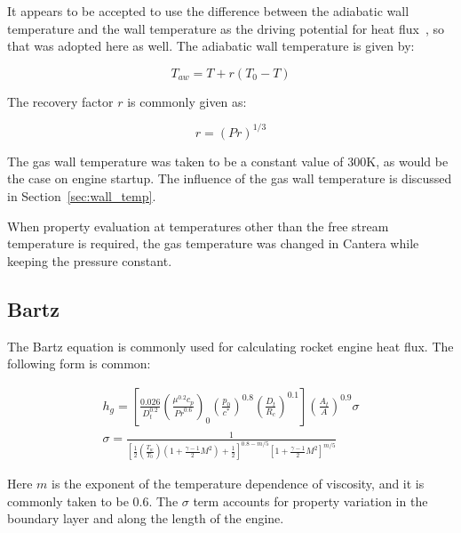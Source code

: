 \documentclass[11pt]{article}
\begin{document}
It appears to be accepted to use the difference between the adiabatic wall temperature and the wall temperature as the driving potential for heat flux~\cite{huang_modern_1992, bartz_turbulent_1965, grisson_liquid_1991}, so that was adopted here as well. The adiabatic wall temperature is given by:

\begin{equation}
    T_{aw} = T + r(T_0 - T)
\end{equation}

The recovery factor $r$ is commonly given as:

\begin{equation}
    r = (Pr)^{1/3}
\end{equation}

The gas wall temperature was taken to be a constant value of 300K, as would be the case on engine startup. The influence of the gas wall temperature is discussed in Section~\ref{sec:wall_temp}.

When property evaluation at temperatures other than the free stream temperature is required, the gas temperature was changed in Cantera while keeping the pressure constant.

\subsection{Bartz}

The Bartz equation is commonly used for calculating rocket engine heat flux. The following form is common:

\begin{equation}
    \label{equation:bartz}
    \begin{split}
         h_g = \left[ \frac{0.026}{D_t^{0.2}} \left( \frac{\mu^{0.2} c_p}{{Pr}^{0.6}} \right)_{0} \left( \frac{p_0}{c^*} \right)^{0.8} \left( \frac{D_t}{R_c} \right)^{0.1} \right] \left( \frac{A_t}{A} \right)^{0.9} \sigma \\
         \sigma = \frac{1}{\left[ \frac{1}{2} \left( \frac{T_{w}}{T_0} \right) \left( 1 + \frac{\gamma - 1}{2} M^2 \right) + \frac{1}{2}\right]^{0.8-m/5} \left[ 1 + \frac{\gamma - 1}{2} M^2 \right]^{m/5}}
    \end{split}
\end{equation}

Here $m$ is the exponent of the temperature dependence of viscosity, and it is commonly taken to be 0.6. The $\sigma$ term accounts for property variation in the boundary layer and along the length of the engine.
\end{document}
